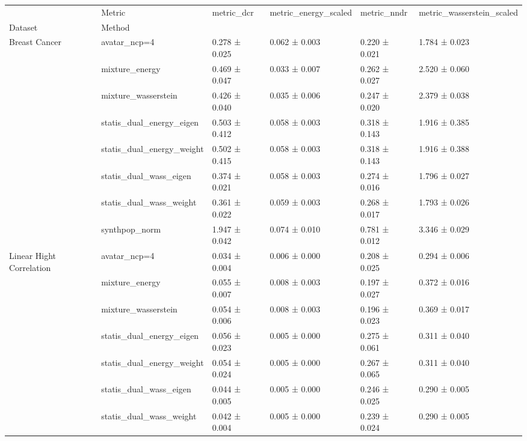 \begin{tabular}{llllll}
\toprule
 & Metric & metric_dcr & metric_energy_scaled & metric_nndr & metric_wasserstein_scaled \\
Dataset & Method &  &  &  &  \\
\midrule
\multirow[t]{8}{*}{Breast Cancer} & avatar_ncp=4 & \cellcolor{mygreen}0.278 ± 0.025 & 0.062 ± 0.003 & \cellcolor{mygreen}0.220 ± 0.021 & \cellcolor{mygreen}1.784 ± 0.023 \\
 & mixture_energy & 0.469 ± 0.047 & \cellcolor{mygreen}0.033 ± 0.007 & 0.262 ± 0.027 & 2.520 ± 0.060 \\
 & mixture_wasserstein & 0.426 ± 0.040 & 0.035 ± 0.006 & 0.247 ± 0.020 & 2.379 ± 0.038 \\
 & statis_dual_energy_eigen & 0.503 ± 0.412 & 0.058 ± 0.003 & 0.318 ± 0.143 & 1.916 ± 0.385 \\
 & statis_dual_energy_weight & 0.502 ± 0.415 & 0.058 ± 0.003 & 0.318 ± 0.143 & 1.916 ± 0.388 \\
 & statis_dual_wass_eigen & 0.374 ± 0.021 & 0.058 ± 0.003 & 0.274 ± 0.016 & 1.796 ± 0.027 \\
 & statis_dual_wass_weight & 0.361 ± 0.022 & 0.059 ± 0.003 & 0.268 ± 0.017 & 1.793 ± 0.026 \\
 & synthpop_norm & \cellcolor{myred}1.947 ± 0.042 & \cellcolor{myred}0.074 ± 0.010 & \cellcolor{myred}0.781 ± 0.012 & \cellcolor{myred}3.346 ± 0.029 \\
\cline{1-6}
\multirow[t]{8}{*}{Linear 
 Hight Correlation} & avatar_ncp=4 & \cellcolor{mygreen}0.034 ± 0.004 & 0.006 ± 0.000 & 0.208 ± 0.025 & 0.294 ± 0.006 \\
 & mixture_energy & 0.055 ± 0.007 & \cellcolor{myred}0.008 ± 0.003 & 0.197 ± 0.027 & 0.372 ± 0.016 \\
 & mixture_wasserstein & 0.054 ± 0.006 & \cellcolor{myred}0.008 ± 0.003 & \cellcolor{mygreen}0.196 ± 0.023 & 0.369 ± 0.017 \\
 & statis_dual_energy_eigen & 0.056 ± 0.023 & \cellcolor{mygreen}0.005 ± 0.000 & 0.275 ± 0.061 & 0.311 ± 0.040 \\
 & statis_dual_energy_weight & 0.054 ± 0.024 & \cellcolor{mygreen}0.005 ± 0.000 & 0.267 ± 0.065 & 0.311 ± 0.040 \\
 & statis_dual_wass_eigen & 0.044 ± 0.005 & \cellcolor{mygreen}0.005 ± 0.000 & 0.246 ± 0.025 & \cellcolor{mygreen}0.290 ± 0.005 \\
 & statis_dual_wass_weight & 0.042 ± 0.004 & \cellcolor{mygreen}0.005 ± 0.000 & 0.239 ± 0.024 & \cellcolor{mygreen}0.290 ± 0.005 \\

\end{tabular}
